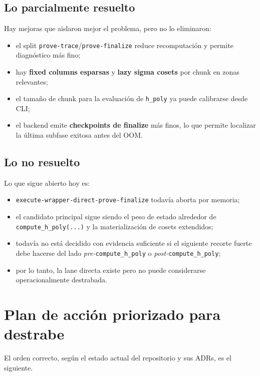 \documentclass[11pt,a4paper]{article}
\begin{document}
\subsection{Lo parcialmente resuelto}

Hay mejoras que aislaron mejor el problema, pero no lo eliminaron:

\begin{itemize}
  \item el split \texttt{prove-trace}/\texttt{prove-finalize} reduce recomputaci\'on y permite diagn\'ostico m\'as fino;
  \item hay \textbf{fixed columns esparsas} y \textbf{lazy sigma cosets} por chunk en zonas relevantes;
  \item el tama\~no de chunk para la evaluaci\'on de \texttt{h\_poly} ya puede calibrarse desde CLI;
  \item el backend emite \textbf{checkpoints de finalize} m\'as finos, lo que permite localizar la \'ultima subfase exitosa antes del OOM.
\end{itemize}

\subsection{Lo no resuelto}

Lo que sigue abierto hoy es:

\begin{itemize}
  \item \texttt{execute-wrapper-direct-prove-finalize} todav\'ia aborta por memoria;
  \item el candidato principal sigue siendo el peso de estado alrededor de
  \texttt{compute\_h\_poly(...)} y la materializaci\'on de cosets extendidos;
  \item todav\'ia no est\'a decidido con evidencia suficiente si el siguiente recorte fuerte
  debe hacerse del lado \emph{pre-}\texttt{compute\_h\_poly} o \emph{post-}\texttt{compute\_h\_poly};
  \item por lo tanto, la lane directa existe pero no puede considerarse operacionalmente destrabada.
\end{itemize}

\section{Plan de acci\'on priorizado para destrabe}

El orden correcto, seg\'un el estado actual del repositorio y sus ADRs, es el siguiente.
\end{document}
